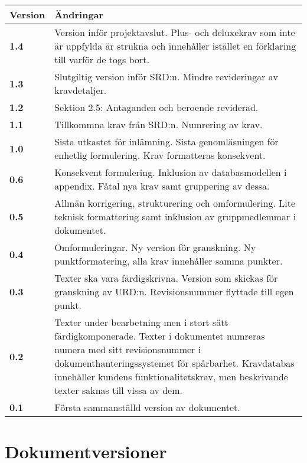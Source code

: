 \documentclass[a4paper, twoside, 11pt, titlepage]{article}
\begin{document}
\begin {table} [ht] \begin{tabular} { p{2.6cm} p{12.5cm} }
	\hline
	{\sffamily\textbf{Version}} & {\sffamily\textbf{Ändringar}} \\
	\hline
	{\sffamily\textbf{1.4}} & {Version inför projektavslut. Plus- och deluxekrav som inte är uppfylda är strukna och innehåller istället en förklaring till varför de togs bort.} \\
	\hline
	{\sffamily\textbf{1.3}} & {Slutgiltig version inför SRD:n. Mindre revideringar av kravdetaljer.} \\
	\hline
	{\sffamily\textbf{1.2}} & {Sektion 2.5: Antaganden och beroende reviderad.} \\
	\hline
	{\sffamily\textbf{1.1}} & {Tillkommna krav från SRD:n. Numrering av krav.} \\
	\hline
	{\sffamily\textbf{1.0}} & {Sista utkastet för inlämning. Sista genomläsningen för enhetlig formulering. Krav formatteras konsekvent.} \\
	\hline
	{\sffamily\textbf{0.6}} & {Konsekvent formulering. Inklusion av databasmodellen i appendix. Fåtal nya krav samt gruppering av dessa.} \\
	\hline
	{\sffamily\textbf{0.5}} & {Allmän korrigering, strukturering och omformulering. Lite teknisk formattering samt inklusion av gruppmedlemmar i dokumentet.} \\
	\hline
	{\sffamily\textbf{0.4}} & {Omformuleringar. Ny version för granskning. Ny punktformatering, alla krav innehåller samma punkter.} \\
	\hline
	{\sffamily\textbf{0.3}} & {Texter ska vara färdigskrivna. Version som skickas för granskning av URD:n. Revisionsnummer flyttade till egen punkt.} \\
	\hline
	{\sffamily\textbf{0.2}} & {Texter under bearbetning men i stort sätt färdigkomponerade. Texter i dokumentet numreras numera med sitt revisionsnummer i dokumenthanteringssystemet för spårbarhet. Kravdatabas innehåller kundens funktionalitetskrav, men beskrivande texter saknas till vissa av dem.} \\
	\hline
	{\sffamily\textbf{0.1}} & {Första sammanställd version av dokumentet.} \\
	\hline
\end{tabular} \end{table} \FloatBarrier


\clearpage
\section*{Dokumentversioner}
\end{document}

